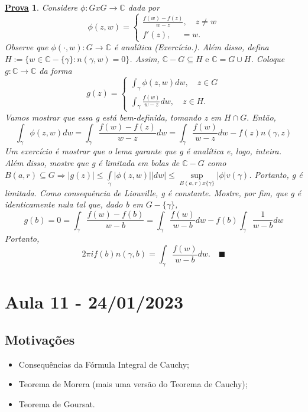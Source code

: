 \documentclass{article}
\newtheorem*{proof*}{\underline{Prova}}
\renewcommand\qedsymbol{$\blacksquare$}
\begin{document}
\begin{proof*}
  Considere $\phi:GxG\rightarrow \mathbb{C}$ dada por 
  $$
    \phi(z, w) = \left\{\begin{array}{ll}
        \frac{f(w)-f(z)}{w-z}, \quad z\neq{w} \\
        f'(z), \quad \ = w.
      \end{array}\right.
  $$
  Observe que $\phi(\cdot, w):G\rightarrow \mathbb{C}$ \'e anal\'itica (Exerc\'icio.). Al\'em disso, defina
$H:=\{w\in{\mathbb{C}-\{\gamma\}}: n(\gamma, w) = 0\}$. Assim, $\mathbb{C}-G\subseteq{H}\text{ e } \mathbb{C} = G\cup{H}$.
Coloque $g:\mathbb{C}\rightarrow \mathbb{C}$ da forma 
  $$
    g(z) = \left\{\begin{array}{ll}
        \int_{\gamma}^{}\phi(z, w)dw, \quad z\in{G} \\
        \int_{\gamma}^{}\frac{f(w)}{w-z}dw, \quad z\in{H}.
      \end{array}\right.
  $$
  Vamos mostrar que essa g est\'a bem-definida, tomando z em $H\cap{G}.$ Ent\~ao,
  $$
    \int_{\gamma}^{}\phi(z, w)dw = \int_{\gamma}^{}\frac{f(w)-f(z)}{w-z}dw = \int_{\gamma}^{}\frac{f(w)}{w-z}dw - f(z)n(\gamma, z)
  $$
  Um exerc\'icio \'e mostrar que o lema garante que g \'e anal\'itica e, logo, inteira. Al\'em disso, mostre que g \'e limitada em
bolas de $\mathbb{C}-G$ como $B(a, r)\subseteq{G}\Rightarrow |g(z)|\leq \int\limits_{\gamma}|\phi(z, w)||dw|\leq \sup\limits_{B(a, r)x \{\gamma\} }|\phi|v(\gamma)$.
Portanto, g \'e limitada. Como consequ\^encia de Liouville, g \'e constante. Mostre, por fim, que g \'e identicamente nula tal que, dado b em
 $G-\{\gamma\}$,
 $$
  g(b) = 0 = \int_{\gamma}^{}\frac{f(w) - f(b)}{w-b} = \int_{\gamma}^{}\frac{f(w)}{w-b}dw - f(b) \int_{\gamma}^{}\frac{1}{w-b}dw
 $$
 Portanto,
 $$
 2\pi if(b)n(\gamma, b) = \int_{\gamma}^{}\frac{f(w)}{w-b}dw. \quad\text{\qedsymbol}
 $$
\end{proof*}
\newpage

\section{Aula 11 - 24/01/2023}
\subsection{Motiva\c c\~oes}
\begin{itemize}
  \item Consequ\^encias da F\'ormula Integral de Cauchy;
  \item Teorema de Morera (mais uma vers\~ao do Teorema de Cauchy);
  \item Teorema de Goursat.
\end{itemize}
\end{document}
